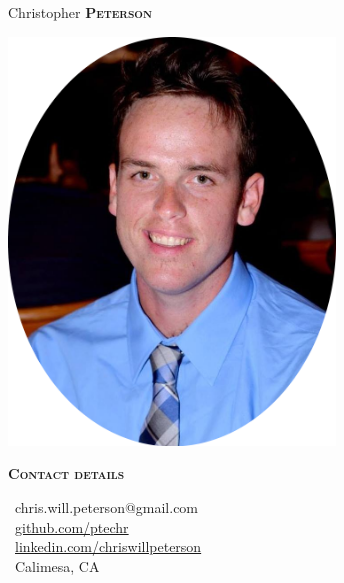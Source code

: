 \documentclass[11pt, a4paper]{article}
\newcommand{\headleft}[1]{\vspace*{3ex}\textsc{\textbf{#1}}\par%
    \vspace*{-1.5ex}\hrulefill\par\vspace*{0.7ex}}
\begin{document}
\setlength{\topskip}{0pt}
\setlength{\parindent}{0pt}
\setlength{\parskip}{0pt}
\setlength{\fboxsep}{0pt}
\pagestyle{empty}
\raggedbottom

\begin{minipage}[t]{0.33\textwidth}
\colorbox{cvblue}{\begin{minipage}[t][5mm][t]{\textwidth}\null\hfill\null\end{minipage}}

\vspace{-.2ex} %
\colorbox{cvblue!90}{\color{white}  %
\textwidth\relax%
\begin{minipage}[t][293mm][t]{0.82\textwidth}
\raggedright
\vspace*{2.5ex}

\Large Christopher \textbf{\textsc{Peterson}} \normalsize 

\null\hfill\includegraphics[width=0.65\textwidth]{cpete.PNG}\hfill\null

\vspace*{0.5ex} %

\headleft{Contact details}
\small %
\faEnvelopeO\ {\small chris.will.peterson@gmail.com} \\[0.4ex]
\faGithub\ \href{https://github.com/ptechr}{github.com/ptechr} \\[0.1ex]
\faLinkedinSquare\ \href{https://www.linkedin.com/in/chriswillpeterson/}{linkedin.com/chriswillpeterson} \\[0.1ex]
\faMapPin\ Calimesa, CA
\normalsize


\end{minipage}}
\end{minipage}
\end{document}
